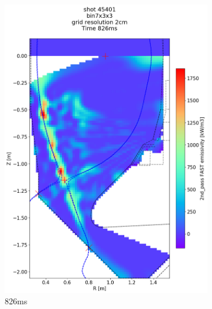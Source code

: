 \begin{figure}
\begin{subfigure}{0.395\linewidth}
         \includegraphics[trim={75 90 0 190},clip,width=\textwidth]{Chapters/chapter2/figs/IRVB-MASTU_shot-45401_export_87.png}
         \vspace*{-6.5mm}
         \caption{826ms}
         \label{fig:45401_export2_4}
     \end{subfigure}
     \begin{subfigure}{0.395\linewidth}
         \centering

\end{subfigure}
\end{figure}
